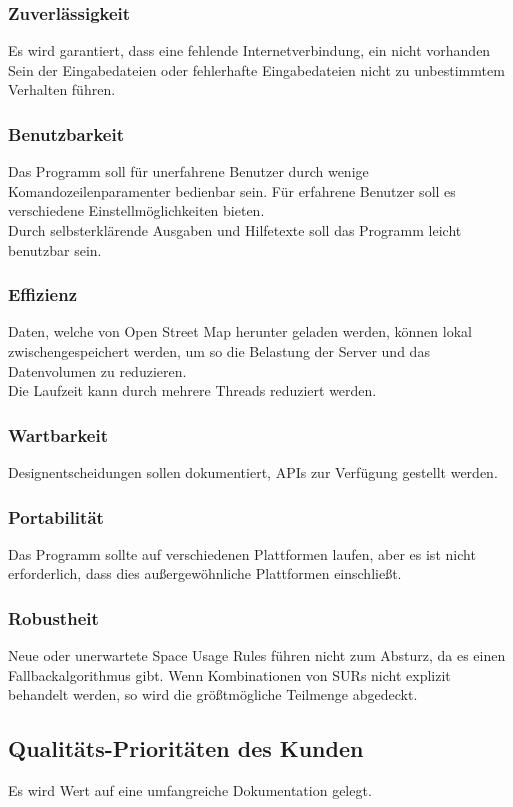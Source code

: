 \subsubsection{Zuverlässigkeit}
Es wird garantiert, dass eine fehlende Internetverbindung, ein nicht vorhanden Sein der Eingabedateien oder fehlerhafte Eingabedateien
nicht zu unbestimmtem Verhalten führen.

\subsubsection{Benutzbarkeit}
Das Programm soll für unerfahrene Benutzer durch wenige Komandozeilenparamenter bedienbar sein. Für erfahrene Benutzer soll es
verschiedene Einstellmöglichkeiten bieten.\\
Durch selbsterklärende Ausgaben und Hilfetexte soll das Programm leicht benutzbar sein.

\subsubsection{Effizienz}
Daten, welche von Open Street Map herunter geladen werden, können lokal zwischengespeichert werden, um so die Belastung der Server und 
das Datenvolumen zu reduzieren.\\
Die Laufzeit kann durch mehrere Threads reduziert werden.

\subsubsection{Wartbarkeit}
Designentscheidungen sollen dokumentiert, APIs zur Verfügung gestellt werden. 

\subsubsection{Portabilität}
Das Programm sollte auf verschiedenen Plattformen laufen, aber es ist nicht erforderlich, dass dies außergewöhnliche Plattformen einschließt.

\subsubsection{Robustheit}
Neue oder unerwartete Space Usage Rules führen nicht zum Absturz, da es einen Fallbackalgorithmus gibt. Wenn Kombinationen von 
SURs nicht explizit behandelt werden, so wird die größtmögliche Teilmenge abgedeckt.

\subsection{Qualitäts-Prioritäten des Kunden}
Es wird Wert auf eine umfangreiche Dokumentation gelegt.

